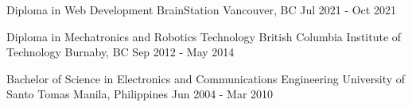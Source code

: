 
\begin{cventries}
  \cventry
    {Diploma in Web Development} %
    {BrainStation} %
    {Vancouver, BC} %
    {Jul 2021 - Oct 2021} %
    {
    }

  \cventry
    {Diploma in Mechatronics and Robotics Technology} %
    {British Columbia Institute of Technology} %
    {Burnaby, BC} %
    {Sep 2012 - May 2014} %
    {}

  \cventry
    {Bachelor of Science in Electronics and Communications Engineering} %
    {University of Santo Tomas} %
    {Manila, Philippines} %
    {Jun 2004 - Mar 2010} %
    {}
    
\end{cventries}

